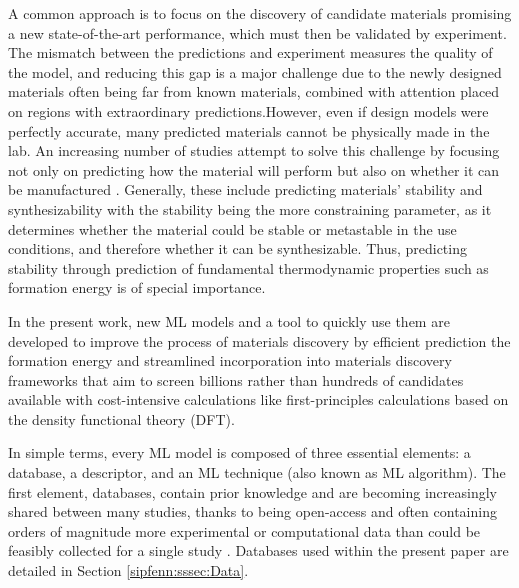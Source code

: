 A common approach is to  focus on the discovery of candidate materials promising a new state-of-the-art performance, which must then be validated by experiment. The mismatch between the predictions and experiment measures the quality of the model, and reducing this gap is a major challenge due to the newly designed materials often being far from known materials, combined with attention placed on regions with extraordinary predictions.However, even if design models were perfectly accurate, many predicted materials cannot be physically made in the lab. An increasing number of studies attempt to solve this challenge by focusing not only on predicting how the material will perform but also on whether it can be manufactured \cite{Alberi2019TheRoadmap}. Generally, these include predicting materials' stability \cite{Balachandran2018PredictionsTheory, Li2019ThermodynamicLearning, I.Hegde2020TheMaterials, Im2022ThermodynamicModeling, Shang2021FormingJoints} and synthesizability \cite{Hattrick-Simpers2018AMaterials,Kononova2019Text-minedRecipes, Aykol2019NetworkDiscovery} with the stability being the more constraining parameter, as it determines whether the material could be stable or metastable in the use conditions, and therefore whether it can be synthesizable. Thus, predicting stability through prediction of fundamental thermodynamic properties such as formation energy is of special importance.

In the present work, new ML models and a tool to quickly use them are developed to improve the process of materials discovery by efficient prediction the formation energy and streamlined incorporation into materials discovery frameworks that aim to screen billions rather than hundreds of candidates available with cost-intensive calculations like first-principles calculations based on the density functional theory (DFT). 

\label{sipfenn:ssec:currentapproach}
In simple terms, every ML model is composed of three essential elements: a database, a descriptor, and an ML technique (also known as ML algorithm). The first element, databases, contain prior knowledge and are becoming increasingly shared between many studies, thanks to being open-access and often containing orders of magnitude more experimental or computational data than could be feasibly collected for a single study \cite{Saal2013MaterialsOQMD,Kirklin2015TheEnergies, vandeWalle2018TheDatabase,Jain2013Commentary:Innovation,Curtarolo2013AFLOW:Discovery,Toher2018TheDiscovery,Pizzi2016AiiDA:Science}. Databases used within the present paper are detailed in Section \ref{sipfenn:sssec:Data}.

